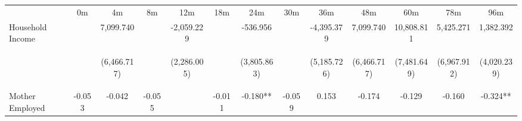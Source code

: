 \begin{tabular}{lcccccccccccc}
\hline \noalign{\smallskip} & 0m & 4m & 8m & 12m & 18m & 24m & 30m & 36m & 48m & 60m & 78m & 96m\\
\noalign{\smallskip}\hline \noalign{\smallskip}Household Income &  & 7,099.740 &  & -2,059.229 &  & -536.956 &  & -4,395.379 & 7,099.740 & 10,808.811 & 5,425.271 & 1,382.392\\
 & \begin{footnotesize}\end{footnotesize} & \begin{footnotesize}(6,466.717)\end{footnotesize} & \begin{footnotesize}\end{footnotesize} & \begin{footnotesize}(2,286.005)\end{footnotesize} & \begin{footnotesize}\end{footnotesize} & \begin{footnotesize}(3,805.863)\end{footnotesize} & \begin{footnotesize}\end{footnotesize} & \begin{footnotesize}(5,185.726)\end{footnotesize} & \begin{footnotesize}(6,466.717)\end{footnotesize} & \begin{footnotesize}(7,481.649)\end{footnotesize} & \begin{footnotesize}(6,967.912)\end{footnotesize} & \begin{footnotesize}(4,020.239)\end{footnotesize}\\
\noalign{\smallskip}Mother Employed & -0.053 & -0.042 & -0.055 &  & -0.011 & -0.180** & -0.059 & 0.153 & -0.174 & -0.129 & -0.160 & -0.324**\\

\end{tabular}
